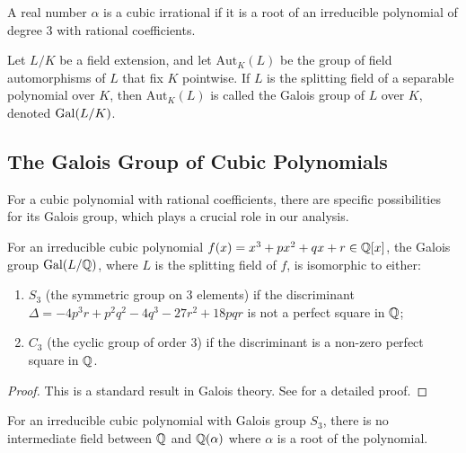 \begin{definition}
A real number $\alpha$ is a cubic irrational if it is a root of an irreducible polynomial of degree 3 with rational coefficients.
\end{definition}

\begin{definition}
Let $L/K$ be a field extension, and let $\text{Aut}_K(L)$ be the group of field automorphisms of $L$ that fix $K$ pointwise. If $L$ is the splitting field of a separable polynomial over $K$, then $\text{Aut}_K(L)$ is called the Galois group of $L$ over $K$, denoted $\operatorname{Gal}(L/K)$.
\end{definition}

\subsection{The Galois Group of Cubic Polynomials}

For a cubic polynomial with rational coefficients, there are specific possibilities for its Galois group, which plays a crucial role in our analysis.

\begin{theorem}\label{thm:cubic_galois}
For an irreducible cubic polynomial $f(x) = x^3 + px^2 + qx + r \in \mathbb{Q}[x]$, the Galois group $\operatorname{Gal}(L/\mathbb{Q})$, where $L$ is the splitting field of $f$, is isomorphic to either:
\begin{enumerate}
    \item $S_3$ (the symmetric group on 3 elements) if the discriminant $\Delta = -4p^3r + p^2q^2 - 4q^3 - 27r^2 + 18pqr$ is not a perfect square in $\mathbb{Q}$;
    \item $C_3$ (the cyclic group of order 3) if the discriminant is a non-zero perfect square in $\mathbb{Q}$.
\end{enumerate}
\end{theorem}

\begin{proof}
This is a standard result in Galois theory. See \cite{Cox2012} for a detailed proof.
\end{proof}

\begin{proposition}\label{prop:no_intermediate_field}
For an irreducible cubic polynomial with Galois group $S_3$, there is no intermediate field between $\mathbb{Q}$ and $\mathbb{Q}(\alpha)$ where $\alpha$ is a root of the polynomial.
\end{proposition}

